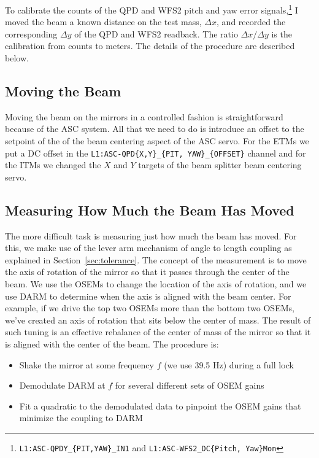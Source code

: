 To calibrate the counts of the QPD and WFS2 pitch and yaw error
signals,\footnote{\texttt{L1:ASC-QPDY\_\{PIT,YAW\}\_IN1} and
\texttt{L1:ASC-WFS2\_DC\{Pitch, Yaw\}Mon}} I moved the beam a
known distance on the test mass, $\Delta x$, and recorded the
corresponding $\Delta y$ of the QPD and WFS2 readback. The ratio
$\Delta x /\Delta y$ is the calibration from counts to meters. The
details of the procedure are described below.


\subsection{Moving the Beam} 
Moving the beam on the mirrors in a controlled fashion is
straightforward because of the ASC system. All that we need to do is
introduce an offset to the setpoint of the of the beam centering
aspect of the ASC servo. For the ETMs we put a DC offset in the
\texttt{L1:ASC-QPD\{X,Y\}\_\{PIT, YAW\}\_\{OFFSET\}} channel and for
the ITMs we changed the $X$ and $Y$ targets of the beam splitter beam
centering servo.

\subsection{Measuring How Much the Beam Has Moved} 
The more difficult task is measuring just how much the beam has
moved. For this, we make use of the lever arm mechanism of angle to
length coupling as explained in Section~\ref{sec:tolerance}. The
concept of the measurement is to move the axis of rotation of the
mirror so that it passes through the center of the beam. We use the
OSEMs to change the location of the axis of rotation, and we use DARM
to determine when the axis is aligned with the beam center. For
example, if we drive the top two OSEMs more than the bottom two OSEMs,
we've created an axis of rotation that sits below the center of
mass. The result of such tuning is an effective rebalance of the
center of mass of the mirror so that it is aligned with the center of
the beam. The procedure is:
\begin{itemize}
\item Shake the mirror at some frequency $f$ (we use
39.5 Hz) during a full lock \vspace{-10pt}
\item Demodulate DARM at $f$ for several different sets of OSEM gains \vspace{-10pt}
\item Fit a quadratic to the demodulated data to pinpoint the OSEM gains that
  minimize the coupling to DARM
\end{itemize}


